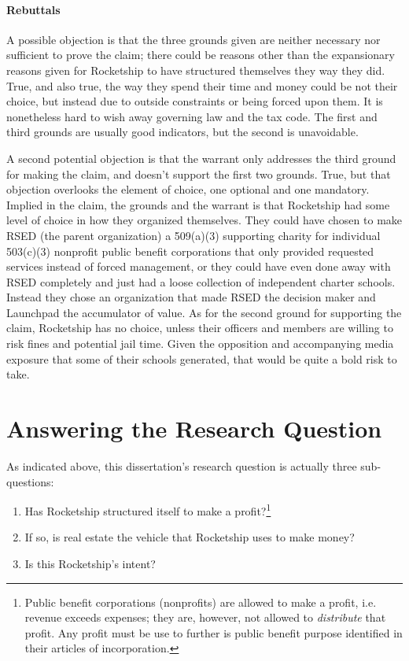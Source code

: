 \paragraph{Rebuttals}
A possible objection is that the three grounds given are neither necessary nor sufficient to prove the claim; there could be reasons other than the expansionary reasons given for Rocketship to have structured themselves they way they did. True, and also true, the way they spend their time and money could be not their choice, but instead due to outside constraints or being forced upon them. It is nonetheless hard to wish away governing law and the tax code. The first and third grounds are usually good indicators, but the second is unavoidable.

A second potential objection is that the warrant only addresses the third ground for making the claim, and doesn't support the first two grounds. True, but that objection overlooks the element of choice, one optional and one mandatory. Implied in the claim, the grounds and the warrant is that Rocketship had some level of choice in how they organized themselves. They could have chosen to make RSED (the parent organization) a 509(a)(3) supporting charity for individual 503(c)(3) nonprofit public benefit corporations that only provided requested services instead of forced management, or they could have even done away with RSED completely and just had a loose collection of independent charter schools. Instead they chose an organization that made RSED the decision maker and Launchpad the accumulator of value. As for the second ground for supporting the claim, Rocketship has no choice, unless their officers and members are willing to risk fines and potential jail time. Given the opposition and accompanying media exposure that some of their schools generated, that would be quite a bold risk to take.

\section{Answering the Research Question}%
\label{sec:answ-rese-quest}\indent%

As indicated above, this dissertation's research question is actually three sub-questions:
\begin{enumerate}
  \item Has Rocketship structured itself to make a profit?\footnote{Public benefit corporations (nonprofits) are allowed to make a profit, i.e. revenue exceeds expenses; they are, however, not allowed to \textit{distribute} that profit. Any profit must be use to further is public benefit purpose identified in their articles of incorporation.}
  \item If so, is real estate the vehicle that Rocketship uses to make money?
  \item Is this Rocketship's intent?
\end{enumerate}

